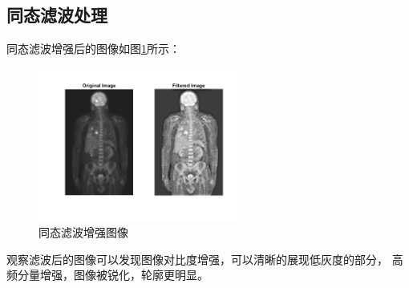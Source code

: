 \documentclass[UTF8]{article}
\begin{document}
\subsection{同态滤波处理}
同态滤波增强后的图像如图\ref{fig:homo}所示：
\begin{figure}[htbp]
    \centering
    \includegraphics[width=0.6\textwidth]{../img/homo.png} %
    \caption{同态滤波增强图像}
    \label{fig:homo}
\end{figure}
\par 观察滤波后的图像可以发现图像对比度增强，可以清晰的展现低灰度的部分，
高频分量增强，图像被锐化，轮廓更明显。
\end{document}
